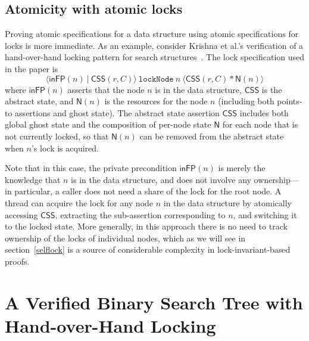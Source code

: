 \documentclass[runningheads]{llncs}
\begin{document}
\subsection{Atomicity with atomic locks}
Proving atomic specifications for a data structure using atomic specifications for locks is more immediate. As an example, consider Krishna et al.'s verification of a hand-over-hand locking pattern for search structures~\cite{templates}. The lock specification used in the paper is $$\langle \mathsf{inFP}(n)\ |\ \mathsf{CSS}(r, C) \rangle\ \mathtt{lockNode}\ n\ \langle \mathsf{CSS}(r, C) * \mathsf{N}(n)\rangle$$ where $\mathsf{inFP}(n)$ asserts that the node $n$ is in the data structure, $\mathsf{CSS}$ is the abstract state, and $\mathsf{N}(n)$ is the resources for the node $n$ (including both points-to assertions and ghost state). The abstract state assertion $\mathsf{CSS}$ includes both global ghost state and the composition of per-node state $\mathsf{N}$ for each node that is not currently locked, so that $\mathsf{N}(n)$ can be removed from the abstract state when $n$'s lock is acquired.

Note that in this case, the private precondition $\mathsf{inFP}(n)$ is merely the knowledge that $n$ is in the data structure, and does not involve any ownership---in particular, a caller does not need a share of the lock for the root node. A thread can acquire the lock for any node $n$ in the data structure by atomically accessing $\mathsf{CSS}$, extracting the sub-assertion corresponding to $n$, and switching it to the locked state. More generally, in this approach there is no need to track ownership of the locks of individual nodes, which as we will see in section~\ref{selflock} is a source of considerable complexity in lock-invariant-based proofs.

\section{A Verified Binary Search Tree with Hand-over-Hand Locking}
\label{hand-over-hand}%
\end{document}
